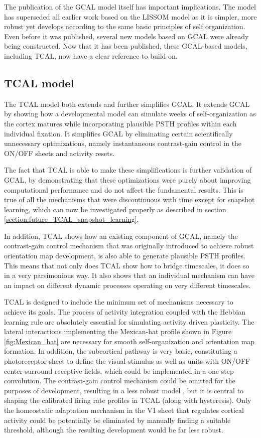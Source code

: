\documentclass[phd,ianc,twoside]{infthesis}
\begin{document}
The publication of the GCAL model itself has important implications. The
model has superseded all earlier work based on the LISSOM
model \citep{miikkulainen_2005} as it is simpler, more robust
yet develops according to the same basic principles of self
organization. Even before it was published, several new models based on
GCAL were already being constructed. Now that it has been
published, these GCAL-based models, including TCAL, now have a clear reference to build on.

\subsection{TCAL model}

The TCAL model both extends and further simplifies GCAL. It extends GCAL
by showing how a developmental model can simulate weeks of self-organization
as the cortex matures while incorporating plausible
PSTH profiles within each individual fixation. It simplifies GCAL by eliminating
certain scientifically unnecessary optimizations, namely instantaneous
contrast-gain control in the ON/OFF sheets and activity resets.

The fact that TCAL is able to make these simplifications is further
validation of GCAL, by demonstrating that these optimizations were purely about
improving computational performance and do not affect the fundamental
results. This is true of all the mechanisms that were discontinuous
with time except for snapshot learning, which can now be investigated
properly as described in section \ref{section:future_TCAL_snapshot_learning}.

In addition, TCAL shows how an existing component of GCAL, namely the
contrast-gain control mechanism that was originally introduced to
achieve robust orientation map development, is also able to generate
plausible PSTH profiles. This means that not only does TCAL show how
to bridge timescales, it does so in a very parsimonious way.  It also
shows that an individual mechanism can have an impact on different
dynamic processes operating on very different timescales.

TCAL is designed to include the minimum set of mechanisms necessary to
achieve its goals. The process of activity integration coupled with the
Hebbian learning rule are absolutely essential for simulating activity
driven plasticity. The lateral interactions implementing the
Mexican-hat profile shown in
Figure \ref{fig:Mexican_hat} are
necessary for smooth self-organization and orientation map formation. In
addition, the subcortical pathway is very basic, constituting a
photoreceptor sheet to define the visual stimulus as well as units
with ON/OFF center-surround receptive fields, which could be
implemented in a one step 
convolution. The contrast-gain control mechanism could be omitted for
the purposes of development, resulting in a less robust model \citep{stevens_jn13}, 
but it is central to shaping the calibrated firing rate profiles in TCAL (along with
hysteresis). Only the homeostatic adaptation mechanism in
the V1 sheet that regulates cortical activity could be potentially be
eliminated by manually finding a suitable threshold, although the
resulting development would be far less robust. 
\end{document}

